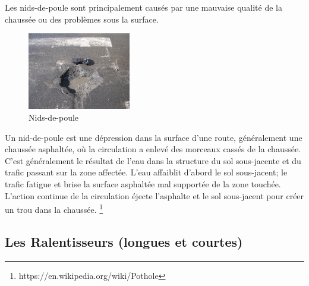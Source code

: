Les nids-de-poule sont principalement causés par une mauvaise qualité de la chaussée ou des problèmes sous la surface.
\begin{figure}[h!]
  \center
  \includegraphics[width=0.4\textwidth]{Images/chapter1/Pothole.jpg}
  \caption{Nids-de-poule}
  \end{figure}
  \newline Un nid-de-poule est une dépression dans la surface d'une route, généralement une chaussée asphaltée, où la circulation 
a enlevé des morceaux cassés de la chaussée. 
C'est généralement le résultat de l'eau dans la structure du sol sous-jacente et du trafic passant sur la zone affectée.
 L'eau affaiblit d'abord le sol sous-jacent; le trafic fatigue et brise la surface asphaltée mal supportée de la zone touchée.
 L'action continue de la circulation éjecte l'asphalte et le sol sous-jacent pour créer un trou dans la chaussée.
\footnote{https://en.wikipedia.org/wiki/Pothole}

\subsection{ Les Ralentisseurs (longues et courtes)}

